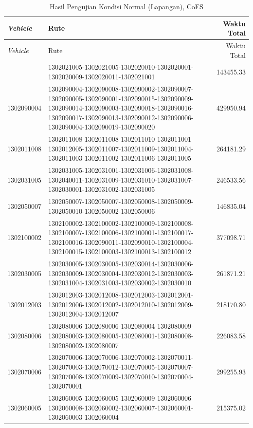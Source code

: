 \begin{longtable}[h]{lp{8cm}r}
	\caption{Hasil Pengujian Kondisi Normal (Lapangan), CoES}
	\label{tbl:test_result_normal_field_coes}\\
	\toprule
		\textit{Vehicle} & Rute & Waktu Total\\ 
	\midrule
	\endfirsthead
	\toprule
		\textit{Vehicle} & Rute & Waktu Total\\ 
	\midrule
	\endhead
	\bottomrule
	\endfoot
		1302021005 & 1302021005-1302021005-1302020010-1302020001-1302020009-1302020011-1302021001 & 143455.33 \\
		1302090004 & 1302090004-1302090008-1302090002-1302090007-1302090005-1302090001-1302090015-1302090009-1302090014-1302090003-1302090018-1302090016-1302090017-1302090013-1302090012-1302090006-1302090004-1302090019-1302090020 & 429950.94 \\
		1302011008 & 1302011008-1302011008-1302011010-1302011001-1302012005-1302011007-1302011009-1302011004-1302011003-1302011002-1302011006-1302011005 & 264181.29 \\
		1302031005 & 1302031005-1302031001-1302031006-1302031008-1302040011-1302031009-1302031010-1302031007-1302030001-1302031002-1302031005 & 246533.56 \\
		1302050007 & 1302050007-1302050007-1302050008-1302050009-1302050010-1302050002-1302050006 & 146835.04 \\
		1302100002 & 1302100002-1302100002-1302100009-1302100008-1302100007-1302100006-1302100001-1302100017-1302100016-1302090011-1302090010-1302100004-1302100015-1302100003-1302100013-1302100012 & 377098.71 \\
		1302030005 & 1302030005-1302030005-1302030014-1302030006-1302030009-1302030004-1302030012-1302030003-1302031004-1302031003-1302030002-1302030010 & 261871.21 \\
		1302012003 & 1302012003-1302012008-1302012003-1302012001-1302012006-1302012002-1302012010-1302012009-1302012004-1302012007 & 218170.80 \\
		1302080006 & 1302080006-1302080006-1302080004-1302080009-1302080003-1302080005-1302080001-1302080008-1302080002-1302080007 & 226083.58 \\
		1302070006 & 1302070006-1302070006-1302070002-1302070011-1302070003-1302070012-1302070005-1302070007-1302070008-1302070009-1302070010-1302070004-1302070001 & 299255.93 \\
		1302060005 & 1302060005-1302060005-1302060009-1302060006-1302060008-1302060002-1302060007-1302060001-1302060003-1302060004 & 215375.02 \\

\end{longtable}
